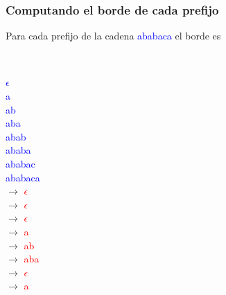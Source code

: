 \documentclass{beamer}
\begin{document}
	\begin{frame}
		\frametitle{Computando el borde de cada prefijo}
		Para cada prefijo de la cadena \textcolor{blue}{ababaca} el borde es\\ \quad \\
		\begin{columns}[l]
				\textcolor{blue}{$\epsilon$}\\
				\textcolor{blue}{a}\\
				\textcolor{blue}{ab}\\
				\textcolor{blue}{aba}\\
				\textcolor{blue}{abab}\\
				\textcolor{blue}{ababa}\\
				\textcolor{blue}{ababac}\\
				\textcolor{blue}{ababaca}\\
				\pause$\rightarrow$ \textcolor{red}{$\epsilon$}\\
				\pause$\rightarrow$ \textcolor{red}{$\epsilon$}\\
				\pause$\rightarrow$ \textcolor{red}{$\epsilon$}\\
				\pause$\rightarrow$ \textcolor{red}{a}\\
				\pause$\rightarrow$ \textcolor{red}{ab}\\
				\pause$\rightarrow$ \textcolor{red}{aba}\\
				\pause$\rightarrow$ \textcolor{red}{$\epsilon$}\\
				\pause$\rightarrow$ \textcolor{red}{a}\\
		\end{columns}
	\end{frame}
	
\end{document}
